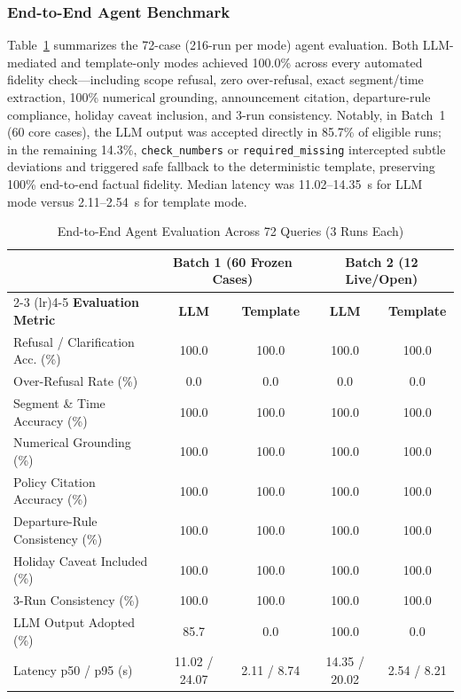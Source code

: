 \documentclass[conference]{IEEEtran}
\begin{document}
\subsubsection{End-to-End Agent Benchmark}
Table~\ref{tab:agent_eval} summarizes the 72-case (216-run per mode) agent evaluation. Both LLM-mediated and template-only modes achieved 100.0\% across every automated fidelity check---including scope refusal, zero over-refusal, exact segment/time extraction, 100\% numerical grounding, announcement citation, departure-rule compliance, holiday caveat inclusion, and 3-run consistency. Notably, in Batch~1 (60 core cases), the LLM output was accepted directly in 85.7\% of eligible runs; in the remaining 14.3\%, \texttt{check\_numbers} or \texttt{required\_missing} intercepted subtle deviations and triggered safe fallback to the deterministic template, preserving 100\% end-to-end factual fidelity. Median latency was 11.02--14.35~s for LLM mode versus 2.11--2.54~s for template mode.

\begin{table}[!t]
\caption{End-to-End Agent Evaluation Across 72 Queries (3 Runs Each)}
\label{tab:agent_eval}
\centering
\scriptsize
\setlength{\tabcolsep}{3.5pt}
\begin{tabular}{lcccc}
\toprule
 & \multicolumn{2}{c}{\textbf{Batch 1 (60 Frozen Cases)}} & \multicolumn{2}{c}{\textbf{Batch 2 (12 Live/Open)}} \\
\cmidrule(lr){2-3} \cmidrule(lr){4-5}
\textbf{Evaluation Metric} & \textbf{LLM} & \textbf{Template} & \textbf{LLM} & \textbf{Template} \\
\midrule
Refusal / Clarification Acc. (\%) & 100.0 & 100.0 & 100.0 & 100.0 \\
Over-Refusal Rate (\%)            & 0.0   & 0.0   & 0.0   & 0.0   \\
Segment \& Time Accuracy (\%)     & 100.0 & 100.0 & 100.0 & 100.0 \\
Numerical Grounding (\%)          & 100.0 & 100.0 & 100.0 & 100.0 \\
Policy Citation Accuracy (\%)     & 100.0 & 100.0 & 100.0 & 100.0 \\
Departure-Rule Consistency (\%)   & 100.0 & 100.0 & 100.0 & 100.0 \\
Holiday Caveat Included (\%)      & 100.0 & 100.0 & 100.0 & 100.0 \\
3-Run Consistency (\%)            & 100.0 & 100.0 & 100.0 & 100.0 \\
LLM Output Adopted (\%)           & 85.7  & 0.0   & 100.0 & 0.0   \\
Latency p50 / p95 (s)             & 11.02 / 24.07 & 2.11 / 8.74 & 14.35 / 20.02 & 2.54 / 8.21 \\
\bottomrule
\end{tabular}
\end{table}
\end{document}

